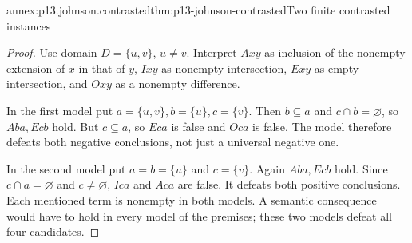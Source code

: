 \begin{annexitem}{annex:p13.johnson.contrasted}{thm:p13-johnson-contrasted}{Two finite contrasted instances}
\begin{proof}
Use domain \(D=\{u,v\}\), \(u\ne v\). Interpret \(Axy\) as
inclusion of the nonempty extension of \(x\) in that of \(y\),
\(Ixy\) as nonempty intersection, \(Exy\) as empty intersection,
and \(Oxy\) as a nonempty difference.

In the first model put \(a=\{u,v\}, b=\{u\}, c=\{v\}\).
Then \(b\subseteq a\) and \(c\cap b=\varnothing\), so
\(Aba,Ecb\) hold. But \(c\subseteq a\), so \(Eca\) is false
and \(Oca\) is false. The model therefore defeats both negative
conclusions, not just a universal negative one.

In the second model put \(a=b=\{u\}\) and \(c=\{v\}\).
Again \(Aba,Ecb\) hold. Since \(c\cap a=\varnothing\) and
\(c\ne\varnothing\), \(Ica\) and \(Aca\) are false.
It defeats both positive conclusions. Each mentioned term is nonempty
in both models. A semantic consequence would have to hold in every
model of the premises; these two models defeat all four candidates.
\end{proof}
\end{annexitem}

